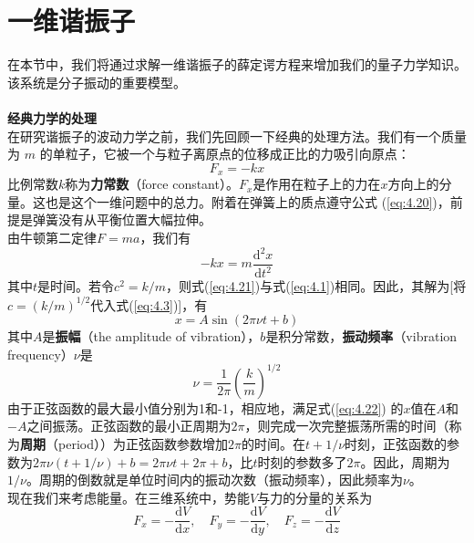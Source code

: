 \section{一维谐振子}
\label{sec:4.2 The One-Dimensional Harmonic Oscillator}
    在本节中，我们将通过求解一维谐振子的薛定谔方程来增加我们的量子力学知识。该系统是分子振动的重要模型。\\
    \\
    \textbf{经典力学的处理}\\
    在研究谐振子的波动力学之前，我们先回顾一下经典的处理方法。我们有一个质量为 $m$ 的单粒子，它被一个与粒子离原点的位移成正比的力吸引向原点：\\
    \begin{equation}
        F_x = -kx
        \label{eq:4.20}
    \end{equation}
    比例常数$k$称为\textbf{力常数}（force constant）。$F_x$是作用在粒子上的力在$x$方向上的分量。这也是这个一维问题中的总力。附着在弹簧上的质点遵守公式 (\ref{eq:4.20})，前提是弹簧没有从平衡位置大幅拉伸。\\
    \indent 由牛顿第二定律$F = ma$，我们有
    \begin{equation}
        - kx = m\frac{\mathrm{d}^2x}{\mathrm{d}t^2}
        \label{eq:4.21}
    \end{equation}
    其中$t$是时间。若令$c^2 = k/m$，则式(\ref{eq:4.21})与式(\ref{eq:4.1})相同。因此，其解为[将$c = \left(k/m\right)^{1/2}$代入式(\ref{eq:4.3})]，有
    \begin{equation}
        x = A \sin\left(2\pi \nu t +b\right)
        \label{eq:4.22}
    \end{equation}
    其中$A$是\textbf{振幅}（the amplitude of vibration），$b$是积分常数，\textbf{振动频率}（vibration frequency）$\nu$是
    \begin{equation}
        \boxed{
            \nu = \frac{1}{2\pi}\left(\frac{k}{m}\right)^{1/2}
        }
        \label{eq:4.23}
    \end{equation}
    由于正弦函数的最大最小值分别为1和-1，相应地，满足式(\ref{eq:4.22}) 的$x$值在$A$和$-A$之间振荡。正弦函数的最小正周期为$2\pi$，则完成一次完整振荡所需的时间（称为\textbf{周期}（period））为正弦函数参数增加$2\pi$的时间。在$t+1/\nu$时刻，正弦函数的参数为$2\pi \nu \left(t+1/\nu\right) + b = 2\pi \nu t + 2\pi + b$，比$t$时刻的参数多了$2\pi$。因此，周期为$1/\nu$。周期的倒数就是单位时间内的振动次数（振动频率），因此频率为$\nu$。\\
    \indent 现在我们来考虑能量。在三维系统中，势能$V$与力的分量的关系为
    \begin{equation}
        \boxed{
            F_x = -\frac{\mathrm{d}V}{\mathrm{d}x}, \quad F_y = -\frac{\mathrm{d}V}{\mathrm{d}y}, \quad F_z = -\frac{\mathrm{d}V}{\mathrm{d}z}
        }
        \label{eq:4.24}
    \end{equation}
